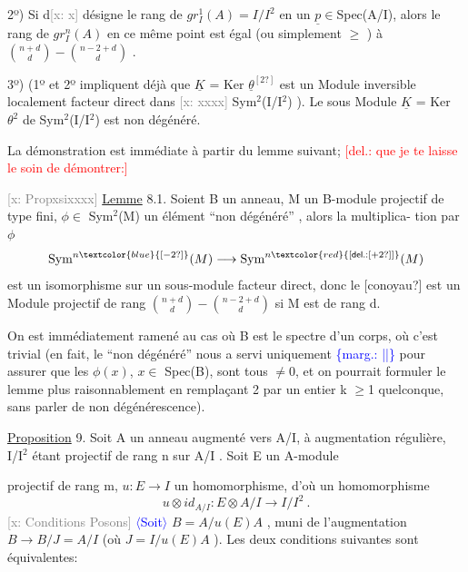 \documentclass[11pt]{article}
\newcommand{\scanpage}[1]{\par\bigskip\noindent{\small\sffamily[scan #1]}\par}
\newcommand{\mspage}[1]{{\small\sffamily[p.\,#1]}}
\newcommand{\hand}[1]{\textcolor{blue}{#1}}
\newcommand{\inserted}[2][]{\textcolor{blue}{$\langle$#2$\rangle$}}
\newcommand{\margin}[1]{\textcolor{blue}{\{\textsf{marg.:} #1\}}}
\newcommand{\deleted}[1]{\textcolor{red}{[\textsf{del.:} #1]}}
\newcommand{\xout}[1]{\textcolor{gray}{[\textsf{x:} #1]}}
\newcommand{\uline}[1]{\underline{#1}}
\newcommand{\unsure}[1]{[#1?]}
\begin{document}
2º) Si d\xout{x} désigne le rang de $gr^{1}_{I}(A) = I/I^{2}$ en un $\underline{p} \in$Spec(A/I),
alors le rang de $gr^{n}_{I}(A)$ en ce même point est égal (ou simplement
$\geqslant$ ) à $\binom{n+d}{d} - \binom{n-2+d}{d}$ .

3º) (1º et 2º impliquent déjà que $\underline{K}$ = Ker $\underline{\theta}^{\unsure{2}}$ est un Module
inversible localement facteur direct dans \xout{xxxx} Sym$^{2}$(I/I$^{2}$) ). Le sous
Module $\underline{K}$ = Ker $\theta^{2}$ de Sym$^{2}$(I/I$^{2}$) est non dégénéré.

La démonstration est immédiate à partir du lemme suivant; \deleted{que je te
laisse le soin de démontrer:}

\xout{Propxsixxxx} \uline{Lemme} 8.1. Soient B un anneau, M un B-module projectif de
type fini, $\phi \in$ Sym$^{2}$(M) un élément ``non dégénéré'' , alors la multiplica-%
tion par $\phi$
\[ \mathrm{Sym}^{n\hand{\unsure{-2}}}(M) \longrightarrow \mathrm{Sym}^{n\deleted{\unsure{+2}}}(M) \]
est un isomorphisme sur un sous-module facteur direct, donc le \unsure{conoyau}
est un Module projectif de rang $\binom{n+d}{d} - \binom{n-2+d}{d}$ si M est de rang d.

On est immédiatement ramené au cas où B est le spectre d'un corps,
où c'est trivial (en fait, le ``non dégénéré'' nous a servi uniquement
\margin{||} pour assurer que les $\phi(x)$, $x \in$ Spec(B), sont tous $\neq 0$, et on pourrait
formuler le lemme plus raisonnablement en remplaçant 2 par un entier
k $\geqslant$1 quelconque, sans parler de non dégénérescence).

\uline{Proposition} 9. Soit A un anneau augmenté vers A/I, à augmentation
régulière, I/I$^{2}$ étant projectif de rang n sur A/I . Soit E un A-module

\mspage{150}

\clearpage
\scanpage{25/151}
\mspage{12}

projectif de rang m,  $u{:}E \to I$ un homomorphisme, d'où un homomorphisme
\[ u\otimes id_{A/I} : E\otimes A/I \longrightarrow I/I^2 \ . \]
\xout{Conditions Posons} \inserted[typed]{Soit} $B = A/u(E)A$ , muni de l'augmentation $B\to B/J = A/I$
(où $J = I/u(E)A$ ). Les deux conditions suivantes sont équivalentes:
\end{document}
